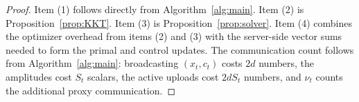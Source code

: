 \documentclass{article}
\theoremstyle{definition}
\begin{document}
\begin{proof}
Item (1) follows directly from Algorithm~\ref{alg:main}. Item (2) is
Proposition~\ref{prop:KKT}. Item (3) is Proposition~\ref{prop:solver}. Item
(4) combines the optimizer overhead from items (2) and (3) with the server-side
vector sums needed to form the primal and control updates. The communication
count follows from Algorithm~\ref{alg:main}: broadcasting $(x_t,c_t)$ costs
$2d$ numbers, the amplitudes cost $S_t$ scalars, the active uploads cost
$2dS_t$ numbers, and $\nu_t$ counts the additional proxy communication.
\end{proof}


% 
\end{document}
